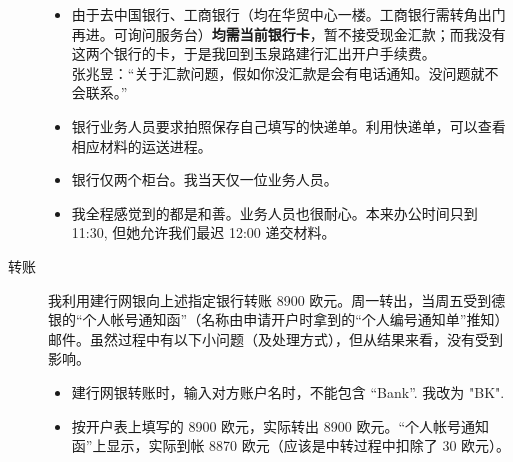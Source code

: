 \documentclass{article}
\begin{document}
\begin{description}
\begin{itemize}
\item 由于去中国银行、工商银行（均在华贸中心一楼。工商银行需转角出门再进。可询问服务台）\textbf{均需\color{blue}当前银行卡}，暂不接受现金汇款；而我没有这两个银行的卡，于是我回到玉泉路建行汇出开户手续费。%
\\
张兆昱：“关于汇款问题，假如你没汇款是会有电话通知。没问题就不会联系。”
\item 银行业务人员要求拍照保存自己填写的快递单。利用快递单，可以查看相应材料的运送进程。
\item 银行仅两个柜台。我当天仅一位业务人员。
\item 我全程感觉到的都是{\color{blue}和善}。业务人员也很耐心。本来办公时间只到 11:30, 但她允许我们最迟 12:00 递交材料。
\end{itemize}
\item[转账] 我利用建行网银向上述指定银行转账 8900 欧元。周一转出，当周五受到德银的“个人帐号通知函”（名称由申请开户时拿到的“个人编号通知单”推知）邮件。虽然过程中有以下小问题（及处理方式），但从结果来看，没有受到影响。
\begin{itemize}
  \item 建行网银转账时，输入对方账户名时，不能包含 ``Bank''. 我改为 "BK".
  \item 按开户表上填写的 8900 欧元，实际转出 8900 欧元。“个人帐号通知函”上显示，实际到帐 8870 欧元（应该是中转过程中扣除了 30 欧元）。
\end{itemize} 
\end{description}
\end{document}
